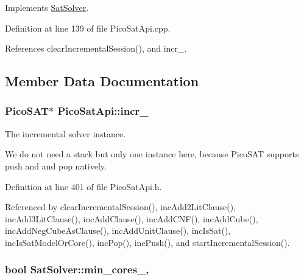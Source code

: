 Implements \hyperlink{classSatSolver_a74603f84c3f2383a5fc44d5a8093cbea}{Sat\-Solver}.



Definition at line 139 of file Pico\-Sat\-Api.\-cpp.



References clear\-Incremental\-Session(), and incr\-\_\-.



\subsection{Member Data Documentation}
\hypertarget{classPicoSatApi_ae056afcfe07c468fd5b1488dc6f6e48d}{
\subsubsection[{incr\-\_\-}]{\setlength{\rightskip}{0pt plus 5cm}Pico\-S\-A\-T$\ast$ Pico\-Sat\-Api\-::incr\-\_\-\hspace{0.3cm}{\ttfamily [protected]}}}\label{classPicoSatApi_ae056afcfe07c468fd5b1488dc6f6e48d}


The incremental solver instance. 

We do not need a stack but only one instance here, because Pico\-S\-A\-T supports push and and pop natively. 

Definition at line 401 of file Pico\-Sat\-Api.\-h.



Referenced by clear\-Incremental\-Session(), inc\-Add2\-Lit\-Clause(), inc\-Add3\-Lit\-Clause(), inc\-Add\-Clause(), inc\-Add\-C\-N\-F(), inc\-Add\-Cube(), inc\-Add\-Neg\-Cube\-As\-Clause(), inc\-Add\-Unit\-Clause(), inc\-Is\-Sat(), inc\-Is\-Sat\-Model\-Or\-Core(), inc\-Pop(), inc\-Push(), and start\-Incremental\-Session().

\hypertarget{classSatSolver_adfeecebfd09606c82b5c57cfe5aad813}{
\subsubsection[{min\-\_\-cores\-\_\-}]{\setlength{\rightskip}{0pt plus 5cm}bool Sat\-Solver\-::min\-\_\-cores\-\_\-\hspace{0.3cm}{\ttfamily [protected]}, {\ttfamily [inherited]}}}\label{classSatSolver_adfeecebfd09606c82b5c57cfe5aad813}


